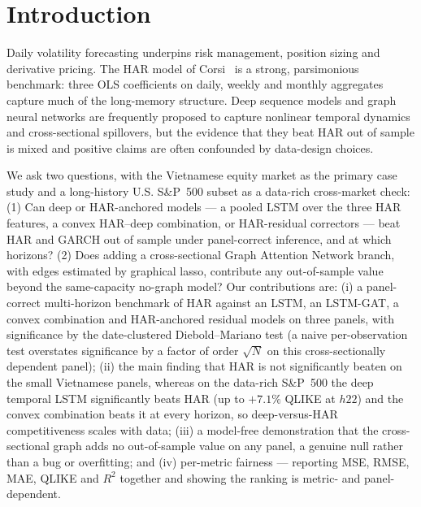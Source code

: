 \documentclass[runningheads]{llncs}
\begin{document}
\section{Introduction}
Daily volatility forecasting underpins risk management, position sizing and derivative pricing. The HAR
model of Corsi~\cite{corsi2009} is a strong, parsimonious benchmark: three OLS coefficients on daily,
weekly and monthly aggregates capture much of the long-memory structure. Deep sequence models and graph
neural networks are frequently proposed to capture nonlinear temporal dynamics and cross-sectional
spillovers, but the evidence that they beat HAR out of sample is mixed and positive claims are often
confounded by data-design choices.

We ask two questions, with the Vietnamese equity market as the primary case study and a long-history U.S.
S\&P~500 subset as a data-rich cross-market check: (1) Can deep or HAR-anchored models --- a pooled LSTM over
the three HAR features, a convex HAR--deep combination, or HAR-residual correctors --- beat HAR and GARCH out
of sample under panel-correct inference, and at which horizons? (2) Does adding a cross-sectional Graph
Attention Network branch, with edges estimated by graphical lasso, contribute any out-of-sample value beyond
the same-capacity no-graph model? Our contributions are: (i) a panel-correct multi-horizon benchmark of HAR
against an LSTM, an LSTM-GAT, a convex combination and HAR-anchored residual models on three panels, with
significance by the date-clustered Diebold--Mariano test (a naive per-observation test overstates
significance by a factor of order $\sqrt{N}$ on this cross-sectionally dependent panel); (ii) the main
finding that HAR is not significantly beaten on the small Vietnamese panels, whereas on the data-rich
S\&P~500 the deep temporal LSTM significantly beats HAR (up to $+7.1\%$ QLIKE at $h22$) and the convex
combination beats it at every horizon, so deep-versus-HAR competitiveness scales with data; (iii) a
model-free demonstration that the cross-sectional graph adds no out-of-sample value on any panel, a genuine
null rather than a bug or overfitting; and (iv) per-metric fairness --- reporting MSE, RMSE, MAE, QLIKE and
$R^2$ together and showing the ranking is metric- and panel-dependent.
\end{document}
